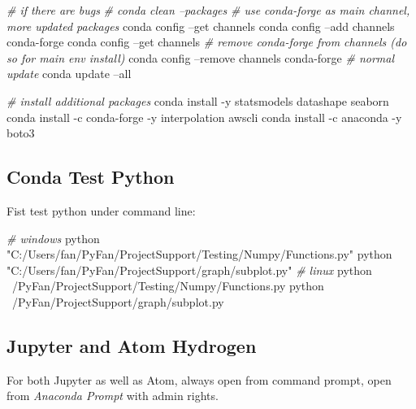 \documentclass[]{article}
\newenvironment{Shaded}{\begin{snugshade}}{\end{snugshade}}
\newcommand{\CommentTok}[1]{\textcolor[rgb]{0.56,0.35,0.01}{\textit{#1}}}
\newcommand{\ExtensionTok}[1]{#1}
\newcommand{\NormalTok}[1]{#1}
\newcommand{\StringTok}[1]{\textcolor[rgb]{0.31,0.60,0.02}{#1}}
\begin{document}
\begin{Shaded}
\begin{Highlighting}[]
\CommentTok{# if there are bugs}
\CommentTok{# conda clean --packages}
\CommentTok{# use conda-forge as main channel, more updated packages}
\ExtensionTok{conda}\NormalTok{ config --get channels}
\ExtensionTok{conda}\NormalTok{ config --add channels conda-forge}
\ExtensionTok{conda}\NormalTok{ config --get channels}
\CommentTok{# remove conda-forge from channels (do so for main env install)}
\ExtensionTok{conda}\NormalTok{ config --remove channels conda-forge}
\CommentTok{# normal update}
\ExtensionTok{conda}\NormalTok{ update --all}

\CommentTok{# install additional packages}
\ExtensionTok{conda}\NormalTok{ install -y statsmodels datashape seaborn}
\ExtensionTok{conda}\NormalTok{ install -c conda-forge -y interpolation awscli}
\ExtensionTok{conda}\NormalTok{ install -c anaconda -y boto3}
\end{Highlighting}
\end{Shaded}

\hypertarget{conda-test-python}{%
\subsection{Conda Test Python}\label{conda-test-python}}

Fist test python under command line:

\begin{Shaded}
\begin{Highlighting}[]
\CommentTok{# windows}
\ExtensionTok{python} \StringTok{"C:/Users/fan/PyFan/ProjectSupport/Testing/Numpy/Functions.py"}
\ExtensionTok{python} \StringTok{"C:/Users/fan/PyFan/ProjectSupport/graph/subplot.py"}
\CommentTok{# linux}
\ExtensionTok{python}\NormalTok{ ~/PyFan/ProjectSupport/Testing/Numpy/Functions.py}
\ExtensionTok{python}\NormalTok{ ~/PyFan/ProjectSupport/graph/subplot.py}
\end{Highlighting}
\end{Shaded}

\hypertarget{jupyter-and-atom-hydrogen}{%
\subsection{Jupyter and Atom Hydrogen}\label{jupyter-and-atom-hydrogen}}

For both Jupyter as well as Atom, always open from command prompt, open
from \emph{Anaconda Prompt} with admin rights.
\end{document}

